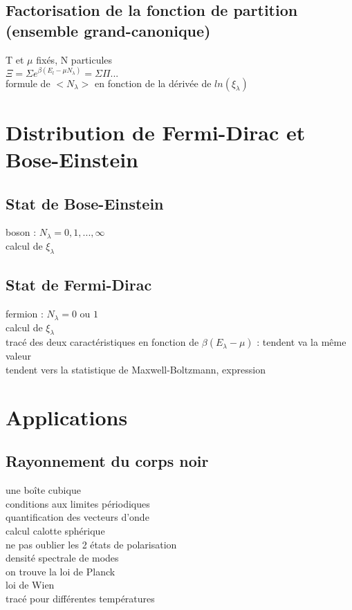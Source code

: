 \subsection{Factorisation de la fonction de partition (ensemble grand-canonique)}
T et $\mu$ fixés, N particules \\
$\Xi=\Sigma e^{\beta \left( E_l - \mu N_\lambda \right) }=\Sigma \Pi ...$  \\

formule de $<N_\lambda>$ en fonction de la dérivée de $ln ( \xi_\lambda )$ \\


\section{Distribution de Fermi-Dirac et Bose-Einstein}
\subsection{Stat de Bose-Einstein}
boson : $N_\lambda=0, 1,..., \infty$ \\
calcul de $\xi_\lambda$ \\
\subsection{Stat de Fermi-Dirac}
fermion : $N_\lambda=0$ ou $1$ \\
calcul de $\xi_\lambda$ \\

tracé des deux caractéristiques en fonction de $\beta(E_\lambda - \mu)$ : tendent va la même valeur \\
tendent vers la statistique de Maxwell-Boltzmann, expression \\

\section{Applications}
\subsection{Rayonnement du corps noir}
une boîte cubique \\
conditions aux limites périodiques \\
quantification des vecteurs d'onde \\
calcul calotte sphérique \\
ne pas oublier les 2 états de polarisation \\
densité spectrale de modes \\
on trouve la loi de Planck \\
loi de Wien \\
tracé pour différentes températures \\

